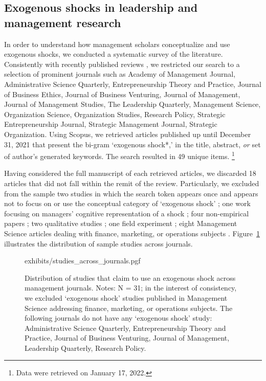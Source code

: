 \begin{refsection}
\subsection{Exogenous shocks in leadership and management research}
\label{subsec:exogenous_shocks_in_management}

\noindent In order to understand how management scholars conceptualize and use
exogenous shocks, we conducted a systematic survey of the literature. 
Consistently with recently published reviews 
\parencite[e.g.,][]{gonzalez_et_al_2018,rindova_et_al_2018}, we restricted our
search to a selection of prominent journals such as Academy of Management
Journal, Administrative Science Quarterly, Entrepreneurship Theory and Practice,
Journal of Business Ethics, Journal of Business Venturing, Journal of
Management, Journal of Management Studies, The Leadership Quarterly, Management
Science, Organization Science, Organization Studies, Research Policy, Strategic
Entrepreneurship Journal, Strategic Management Journal, Strategic Organization.
Using Scopus, we retrieved articles published up until December 31, 2021
that present the bi-gram `exogenous shock*,' in the title, abstract, \emph{or} set of
author's generated keywords. The search resulted in 49 unique items.
\footnote{Data were retrieved on January 17, 2022.}

Having considered the full manuscript of each retrieved articles, we discarded
18 articles that did not fall within the remit of the review. Particularly, 
we excluded from the sample two studies in which the search token appears once and 
appears not to focus on or use the conceptual category of `exogenous shock'
\parencite{uzzi199735,kriauciunas2006659}; one work focusing on managers'
cognitive representation of a shock \parencite{barreto2013687}; four non-empirical papers
\parencite[e.g.,][]{mcsweeney2009933}; two qualitative studies
\parencite{glynn20051031, jenkins2010884}; one field experiment 
\parencite{cui20191216}; eight Management Science articles dealing with 
finance, marketing, or operations subjects \parencite[e.g.,][]{tham20182901}.
Figure~\ref{fig:studies_across_journals} illustrates the distribution of sample
studies across journals.

\begin{figure}[!htbp]
    \centering
    {exhibits/studies_across_journals.pgf}
    \caption{Distribution of studies that claim to use an exogenous shock across
    management journals.  Notes: N = 31; in the interest of consistency, we
    excluded `exogenous shock' studies published in Management Science addressing
    finance, marketing, or operations subjects. The following journals do not have any
    `exogenous shock' study: Administrative Science Quarterly, Entrepreneurship
    Theory and Practice, Journal of Business Venturing, Journal of Management,
    Leadership Quarterly, Research Policy.}
    \label{fig:studies_across_journals}
\end{figure}         


\end{refsection}
